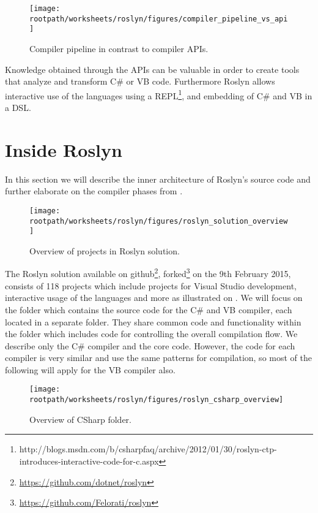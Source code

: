 \begin{figure}[htbp]
\centering
 \texttt{[image: \\rootpath/worksheets/roslyn/figures/compiler\_pipeline\_vs\_api]} 
 \caption{Compiler pipeline in contrast to compiler APIs\cite[p. 4]{ng2012roslyn}.}
\label{fig:api_vs_compiler_pipeline}
\end{figure}

Knowledge obtained through the APIs can be valuable in order to create tools that analyze and transform C\# or \ac{VB} code. Furthermore Roslyn allows interactive use of the languages using a \acs{REPL}\footnote{http://blogs.msdn.com/b/csharpfaq/archive/2012/01/30/roslyn-ctp-introduces-interactive-code-for-c.aspx}, and embedding of  C\# and \ac{VB} in a \ac{DSL}\cite[p. 3]{ng2012roslyn}.

\section{Inside Roslyn}
In this section we will describe the inner architecture of Roslyn's source code and further elaborate on the compiler phases from .

\begin{figure}[htbp]
\centering
 \texttt{[image: \\rootpath/worksheets/roslyn/figures/roslyn\_solution\_overview]} 
 \caption{Overview of projects in Roslyn solution.}
\label{fig:roslyn_solution_overview}
\end{figure}

The Roslyn solution available on github\footnote{\url{https://github.com/dotnet/roslyn}}, forked\footnote{\url{https://github.com/Felorati/roslyn}} on the 9th February 2015, consists of 118 projects which include projects for Visual Studio development, interactive usage of the languages and more as illustrated on . We will focus on the  folder which contains the source code for the C\# and \ac{VB} compiler, each located in a separate folder. They share common code and functionality within the  folder which includes code for controlling the overall compilation flow. We describe only the C\# compiler and the core code. However, the code for each compiler is very similar and use the same patterns for compilation\cite[09:36-10:36]{campbellDeeperRos}, so most of the following will apply for the \ac{VB} compiler also.

\begin{figure}[htbp]
\centering
 \texttt{[image: \\rootpath/worksheets/roslyn/figures/roslyn\_csharp\_overview]} 
 \caption{Overview of CSharp folder.}
\label{fig:roslyn_csharp_overview}
\end{figure}

